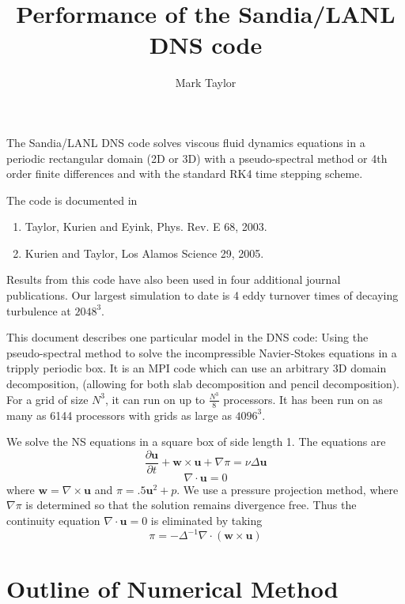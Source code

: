 \documentclass[12pt]{article}
\title{Performance of the Sandia/LANL DNS code}
\author{Mark Taylor}
\newcommand{\uv}{\mathbf u}
\newcommand{\vor}{\mathbf w}
\newcommand{\grad}{\nabla}
\newcommand{\curl}{\grad \times}
\renewcommand{\div}{\grad \cdot}
\begin{document}


The Sandia/LANL DNS code solves viscous fluid dynamics equations in a
periodic rectangular domain (2D or 3D) with a pseudo-spectral method
or 4th order finite differences and with the standard RK4 time
stepping scheme.

The code is documented in 
\begin{enumerate}
\item Taylor, Kurien and Eyink, Phys. Rev. E 68, 2003. 
\item Kurien and Taylor, Los Alamos Science 29, 2005. 
\end{enumerate}
Results from this code have also been used in four additional journal
publications.  Our largest simulation to date is 4 eddy turnover
times of decaying turbulence at $2048^3$.  

This document describes one particular model in the DNS code:
Using the pseudo-spectral method to solve the 
incompressible Navier-Stokes equations in a tripply periodic
box.  It is an MPI code which can use
an arbitrary 3D domain decomposition, (allowing for both slab
decomposition and pencil decomposition).  For a grid of size $N^3$, it
can run on up to $\frac{N^3}{8}$ processors.  It has 
been run on as many as 6144 processors with grids as large
as $4096^3$.

We solve the NS equations in a square box of side length 1.
The equations are
\[
\frac{ \partial  \uv }{\partial t}  + \vor  \times \uv + 
\grad \pi   = \nu \Delta \uv
\]
\[
\div \uv = 0
\]
where $\vor = \curl \uv$ and $\pi = .5 \uv^2 + p$.  
We use a pressure projection method,
where $\grad \pi$ is determined so that the solution remains
divergence free.  Thus the continuity equation $\div \uv = 0$
is eliminated by taking
\[
 \pi = - \Delta^{-1} \div \left( \vor \times \uv  \right)
\]


\section{Outline of Numerical Method}
\end{document}
